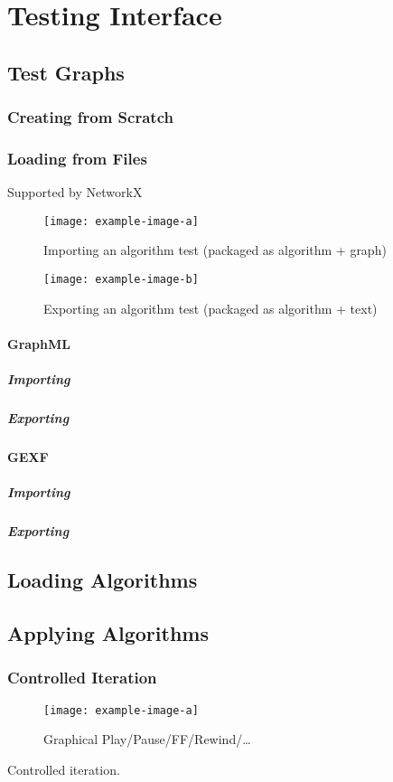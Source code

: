 \section{Testing Interface}
\label{sec:interface-testing}

\subsection{Test Graphs}
\subsubsection{Creating from Scratch}
\subsubsection{Loading from Files}
\label{sec:interface-testing:import}
Supported by NetworkX~\autocite{hagberg:networkx}
\begin{figure}
  \centering
  \texttt{[image: example-image-a]}
  \caption{Importing an algorithm test (packaged as algorithm + graph)}
  \label{fig:iface:alg-test-import}
\end{figure}
\begin{figure}
  \centering
  \texttt{[image: example-image-b]}
  \caption{Exporting an algorithm test (packaged as algorithm + text)}
  \label{fig:iface:alg-test-export}
\end{figure}
\paragraph{GraphML}
\subparagraph{Importing}
\subparagraph{Exporting}

\paragraph{GEXF}
\subparagraph{Importing}
\subparagraph{Exporting}

\subsection{Loading Algorithms} %
\subsection{Applying Algorithms}
\subsubsection{Controlled Iteration}
\begin{figure}
  \centering
  \texttt{[image: example-image-a]}
  \caption{Graphical Play\slash Pause\slash FF\slash Rewind\slash\dots}
  \label{fig:iface:alg-test-controlled}
\end{figure}
\begin{draftvspace}{2in}
  Controlled iteration.
\end{draftvspace}
